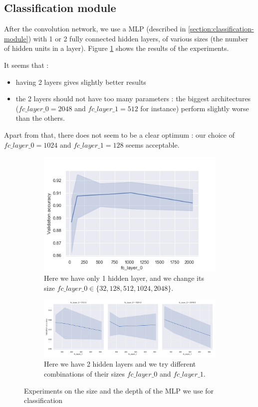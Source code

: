 \documentclass{article}
\begin{document}
\subsection{Classification module}
After the convolution network, we use a MLP (described in \ref{section:classification-module}) with 1 or 2 fully connected hidden layers, of various sizes (the number of hidden units in a layer). Figure \ref{fig:fc_layers} shows the results of the experiments.
\par
It seems that :
\begin{itemize}
    \item having 2 layers gives slightly better results
    \item the 2 layers should not have too many parameters : the biggest architectures ($fc\_layer\_0=2048$ and $fc\_layer\_1=512$ for instance) perform slightly worse than the others.
\end{itemize}
Apart from that, there does not seem to be a clear optimum : our choice of $fc\_layer\_0=1024$ and $fc\_layer\_1=128$ seems acceptable.
\begin{figure}
    \centering
    \begin{subfigure}{0.6\linewidth}
        \includegraphics[width=\linewidth]{img/1_fc_layers.jpg}
        \caption{Here we have only 1 hidden layer, and we change its size $fc\_layer\_0 \in \{32, 128, 512, 1024, 2048\}$.}
    \end{subfigure}
    \begin{subfigure}{\linewidth}
        \includegraphics[width=\linewidth]{img/2_fc_layers.jpg}
        \caption{Here we have 2 hidden layers and we try different combinations of their sizes $fc\_layer\_0$ and $fc\_layer\_1$.}
    \end{subfigure}
    \caption{Experiments on the size and the depth of the MLP we use for classification}
    \label{fig:fc_layers}
\end{figure}
\end{document}
